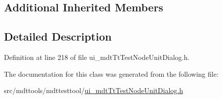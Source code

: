 \subsection*{Additional Inherited Members}


\subsection{Detailed Description}


Definition at line 218 of file ui\-\_\-mdt\-Tt\-Test\-Node\-Unit\-Dialog.\-h.



The documentation for this class was generated from the following file\-:\begin{DoxyCompactItemize}
\item 
src/mdttools/mdttesttool/\hyperlink{ui__mdt_tt_test_node_unit_dialog_8h}{ui\-\_\-mdt\-Tt\-Test\-Node\-Unit\-Dialog.\-h}\end{DoxyCompactItemize}
